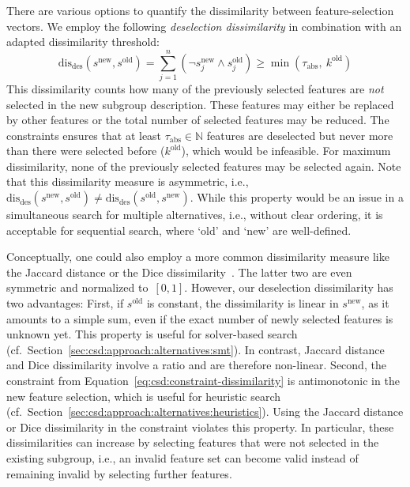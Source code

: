 \documentclass{article}
\theoremstyle{definition}
\begin{document}
There are various options to quantify the dissimilarity between feature-selection vectors.
We employ the following \emph{deselection dissimilarity} in combination with an adapted dissimilarity threshold:
%
\begin{equation}
	\text{dis}_{\text{des}}(s^{\text{new}}, s^{\text{old}}) = \sum_{j=1}^n (\lnot s^{\text{new}}_j \land s^{\text{old}}_j) \geq \min \left( \tau_{\text{abs}},~k^{\text{old}} \right)
	\label{eq:csd:constraint-dissimilarity}
\end{equation}
%
This dissimilarity counts how many of the previously selected features are \emph{not} selected in the new subgroup description.
These features may either be replaced by other features or the total number of selected features may be reduced.
The constraints ensures that at least $\tau_{\text{abs}} \in \mathbb{N}$ features are deselected but never more than there were selected before ($k^{\text{old}}$), which would be infeasible.
For maximum dissimilarity, none of the previously selected features may be selected again.
Note that this dissimilarity measure is asymmetric, i.e., $\text{dis}_{\text{des}}(s^{\text{new}}, s^{\text{old}}) \neq \text{dis}_{\text{des}}(s^{\text{old}}, s^{\text{new}})$.
While this property would be an issue in a simultaneous search for multiple alternatives, i.e., without clear ordering, it is acceptable for sequential search, where `old' and `new' are well-defined.

Conceptually, one could also employ a more common dissimilarity measure like the Jaccard distance or the Dice dissimilarity~\cite{choi2010survey}.
The latter two are even symmetric and normalized to~$[0,1]$.
However, our deselection dissimilarity has two advantages:
First, if $s^{\text{old}}$ is constant, the dissimilarity is linear in $s^{\text{new}}$, as it amounts to a simple sum, even if the exact number of newly selected features is unknown yet.
This property is useful for solver-based search (cf.~Section~\ref{sec:csd:approach:alternatives:smt}).
In contrast, Jaccard distance and Dice dissimilarity involve a ratio and are therefore non-linear.
Second, the constraint from Equation~\ref{eq:csd:constraint-dissimilarity} is antimonotonic in the new feature selection, which is useful for heuristic search (cf.~Section~\ref{sec:csd:approach:alternatives:heuristics}).
Using the Jaccard distance or Dice dissimilarity in the constraint violates this property.
In particular, these dissimilarities can increase by selecting features that were not selected in the existing subgroup, i.e., an invalid feature set can become valid instead of remaining invalid by selecting further features.
\end{document}
